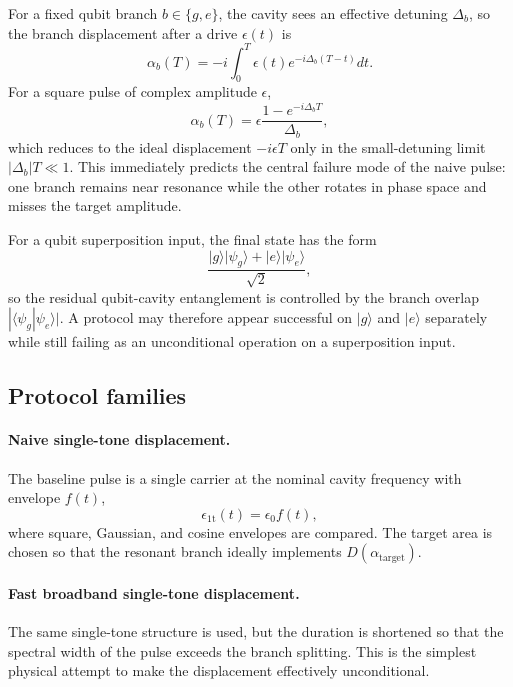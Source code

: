 \documentclass[aps,pra,twocolumn,reprint,floatfix,amsmath,amssymb]{revtex4-2}
\begin{document}
For a fixed qubit branch \(b \in \{g,e\}\), the cavity sees an effective detuning \(\Delta_b\), so the branch displacement after a drive \(\epsilon(t)\) is
\begin{equation}
\alpha_b(T) = -i \int_0^T \epsilon(t) e^{-i \Delta_b (T-t)} dt.
\label{eq:branchalpha}
\end{equation}
For a square pulse of complex amplitude \(\epsilon\),
\begin{equation}
\alpha_b(T)=\epsilon\frac{1-e^{-i\Delta_b T}}{\Delta_b},
\label{eq:squarebranch}
\end{equation}
which reduces to the ideal displacement \(-i\epsilon T\) only in the small-detuning limit \(|\Delta_b|T \ll 1\). This immediately predicts the central failure mode of the naive pulse: one branch remains near resonance while the other rotates in phase space and misses the target amplitude.

For a qubit superposition input, the final state has the form
\begin{equation}
\frac{|g\rangle |\psi_g\rangle + |e\rangle |\psi_e\rangle}{\sqrt{2}},
\end{equation}
so the residual qubit-cavity entanglement is controlled by the branch overlap \(|\langle \psi_g | \psi_e \rangle|\). A protocol may therefore appear successful on \(|g\rangle\) and \(|e\rangle\) separately while still failing as an unconditional operation on a superposition input.

\subsection{Protocol families}

\paragraph*{Naive single-tone displacement.}
The baseline pulse is a single carrier at the nominal cavity frequency with envelope \(f(t)\),
\begin{equation}
\epsilon_{\mathrm{1t}}(t) = \epsilon_0 f(t),
\end{equation}
where square, Gaussian, and cosine envelopes are compared. The target area is chosen so that the resonant branch ideally implements \(D(\alpha_{\mathrm{target}})\).

\paragraph*{Fast broadband single-tone displacement.}
The same single-tone structure is used, but the duration is shortened so that the spectral width of the pulse exceeds the branch splitting. This is the simplest physical attempt to make the displacement effectively unconditional.
\end{document}

